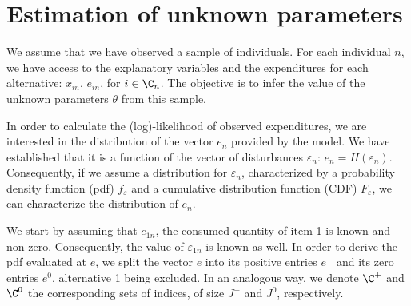 \documentclass[12pt,a4paper]{article}
\begin{document}
\section{Estimation of unknown parameters}
\label{sec:likelihood}

We assume that we have observed a sample of individuals. For each individual $n$, we have access to the explanatory
variables and the expenditures for each alternative: $x_{in}$, $e_{in}$, for $i \in \C_n$. The objective is to infer the
value of the unknown parameters $\theta$ from this sample.

In order to calculate the (log)-likelihood of observed expenditures, we are interested in the distribution of the vector $e_n$
provided by the model. We have
established that it is a function of the vector of disturbances
$\varepsilon_n$: $e_n = H(\varepsilon_n)$.  Consequently, if we assume
a distribution for $\varepsilon_n$, characterized by a probability
density function (pdf) $f_\varepsilon$ and a cumulative distribution
function (CDF) $F_\varepsilon$, we can characterize the distribution of $e_n$.

We start by assuming that $e_{1n}$, the consumed quantity of item 1 is
known and non zero. Consequently, the value of $\varepsilon_{1n}$ is known as
well. In order to derive the pdf evaluated at $e$, we split the vector $e$ into its positive entries $e^+$ and its
zero entries $e^0$, alternative 1 being excluded. In an analogous way, we denote $\C^+$ and $\C^0$ the corresponding sets of indices, of size $J^+$ and $J^0$, respectively.
\end{document}
